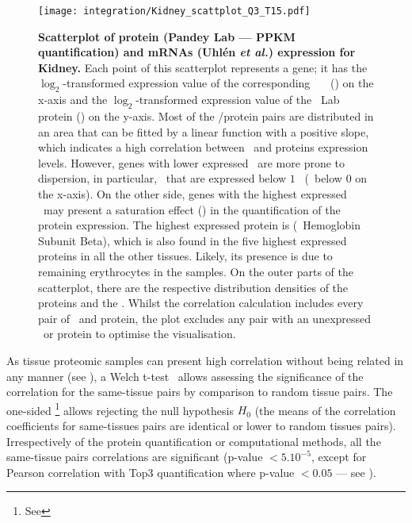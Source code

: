 \begin{figure}[!htbp]
    \texttt{[image: integration/Kidney\_scattplot\_Q3\_T15.pdf]}\centering
    \caption[Scatterplot of protein (Pandey Lab data --- PPKM quantification)
    and mRNA (Uhlén \etal) expression for Kidney]
    {\label{fig:ScatKid}\textbf{Scatterplot of
    protein (Pandey Lab --- PPKM quantification) and mRNAs (Uhlén \textit{et al.})
    expression for Kidney.}
    Each point of this scatterplot represents a gene;
    it has the $\log_2$-transformed expression value
    of the corresponding \uhlen\ \etal\ \mRNA\ (\FPKM) on the x-axis and
    the $\log_2$-transformed expression value of
    the \pandey\ Lab protein (\PPKM) on the y-axis.
    Most of the \mRNA/protein pairs are distributed in an area
    that can be fitted by a linear function with a positive slope,
    which indicates a high correlation between \mRNAs\ and proteins expression
    levels.
    However, genes with lower expressed \mRNAs\ are more prone to dispersion,
    in particular, \mRNAs\ that are expressed below $1$ \FPKM\ (\ie\ below $0$ on
    the x-axis).
    On the other side, genes with the highest expressed \mRNAs\ may present
    a saturation effect ()
    in the quantification of the protein expression.
    The highest expressed protein is 
    (\ie\ Hemoglobin Subunit Beta), which is also found in
    the five highest expressed proteins in all the other tissues.
    Likely, its presence is due to remaining erythrocytes in the samples.
    On the outer parts of the scatterplot,
    there are the respective distribution densities of the proteins and the \mRNAs.
    Whilst the correlation calculation includes every pair of \mRNA\ and protein,
    the plot excludes any pair with an unexpressed \mRNA\ or protein to optimise the visualisation.}
\end{figure}

As tissue proteomic samples can present high correlation
without being related in any manner
(see ),
a Welch t-test~ allows
assessing the significance of the correlation for the same-tissue pairs
by comparison to random tissue pairs.
The one-sided \Welchttest\footnote{See }
allows rejecting the null hypothesis $H_0$
(the means of the correlation coefficients for same-tissues pairs
are identical or lower to random tissues pairs).
Irrespectively of the protein quantification or computational methods,
all the same-tissue pairs correlations are significant
(p-value $<5.10^{-5}$, except for Pearson correlation with Top3 quantification
where p-value $<0.05$ --- see ).\mybr\

